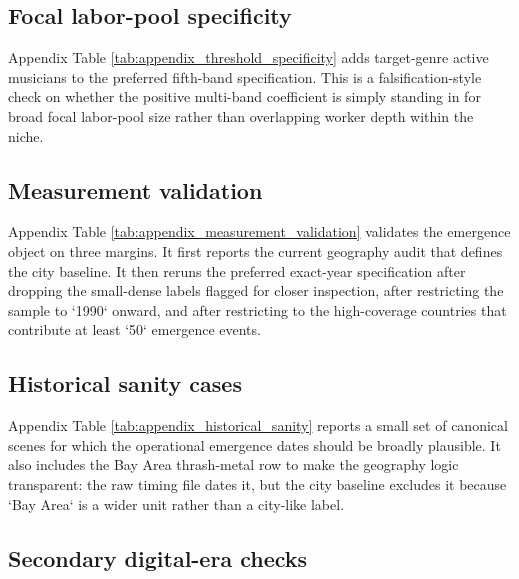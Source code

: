 

\subsection{Focal labor-pool specificity}

Appendix Table \ref{tab:appendix_threshold_specificity} adds target-genre active musicians to the
preferred fifth-band specification. This is a falsification-style check on whether the positive
multi-band coefficient is simply standing in for broad focal labor-pool size rather than
overlapping worker depth within the niche.



\subsection{Measurement validation}

Appendix Table \ref{tab:appendix_measurement_validation} validates the emergence object on three
margins. It first reports the current geography audit that defines the city baseline. It then reruns
the preferred exact-year specification after dropping the small-dense labels flagged for closer
inspection, after restricting the sample to `1990` onward, and after restricting to the
high-coverage countries that contribute at least `50` emergence events.



\subsection{Historical sanity cases}

Appendix Table \ref{tab:appendix_historical_sanity} reports a small set of canonical scenes for
which the operational emergence dates should be broadly plausible. It also includes the Bay Area
thrash-metal row to make the geography logic transparent: the raw timing file dates it, but the
city baseline excludes it because `Bay Area` is a wider unit rather than a city-like label.



\subsection{Secondary digital-era checks}
\label{app:digital_checks}

